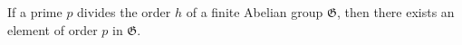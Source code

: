If a prime $p$ divides the order $h$ of a finite Abelian group $\mathfrak{G}$, then there exists an element of order $p$ in $\mathfrak{G}$.
